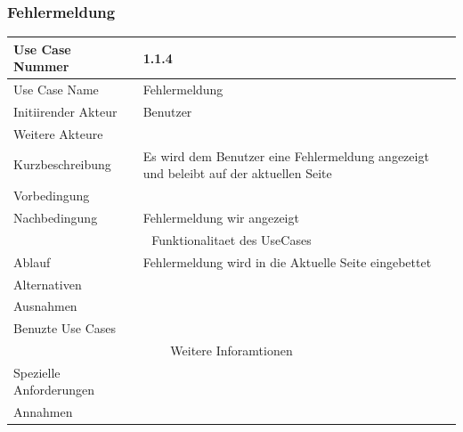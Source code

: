 \documentclass[10pt,a4paper]{article}
\begin{document}
	\subsubsection{Fehlermeldung}
		\begin{tabular}{|l|p{.5\linewidth}|}
		\hline Use Case Nummer & 1.1.4 \\ 
		\hline Use Case Name & Fehlermeldung \\ 
		\hline Initiirender Akteur & Benutzer \\
		\hline Weitere Akteure &  \\
		\hline Kurzbeschreibung & Es wird dem Benutzer eine Fehlermeldung angezeigt und beleibt auf der aktuellen Seite \\
		\hline Vorbedingung &  \\
		\hline Nachbedingung & Fehlermeldung wir angezeigt \\
		\hline \multicolumn{2}{|c|}{Funktionalitaet des UseCases}\\
		\hline Ablauf & Fehlermeldung wird in die Aktuelle Seite eingebettet \\
		\hline Alternativen &  \\
		\hline Ausnahmen &  \\
		\hline Benuzte Use Cases &  \\
		\hline \multicolumn{2}{|c|}{Weitere Inforamtionen} \\
		\hline Spezielle Anforderungen &  \\
		\hline Annahmen &  \\
		\hline
		\end{tabular} 
	 
\end{document}
